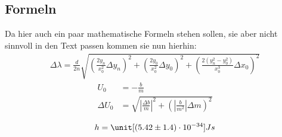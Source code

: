 \begin{appendix}
  \section{Formeln}
  Da hier auch ein paar mathematische Formeln stehen sollen, sie aber nicht
  sinnvoll in den Text passen kommen sie nun hierhin:
  \begin{align}
      \Delta \lambda = \frac{d}{2 n}
          \sqrt{
              \left(\frac{2 y_n}{x^2_0} \Delta y_n\right)^2
             +\left(\frac{2 y_0}{x^2_0} \Delta y_0\right)^2
             +\left(\frac{2\left(y^2_n - y^2_0\right)}{x^3_0}\Delta x_0\right)^2}
  \end{align}
  \begin{align}
      U_0 &= -\frac{b}{m} \\
      \Delta U_0 &= \sqrt{\left|\frac{\Delta b}{m}\right|^2
                  + \left(\left|\frac{b}{m^2}\right| \Delta m\right)^2}
  \end{align}

  \begin{align}
      h = \unit[(5.42 \pm 1.4)\cdot 10^{-34}]{Js}
      \label{eq:ergebnis}
  \end{align}
\end{appendix}
